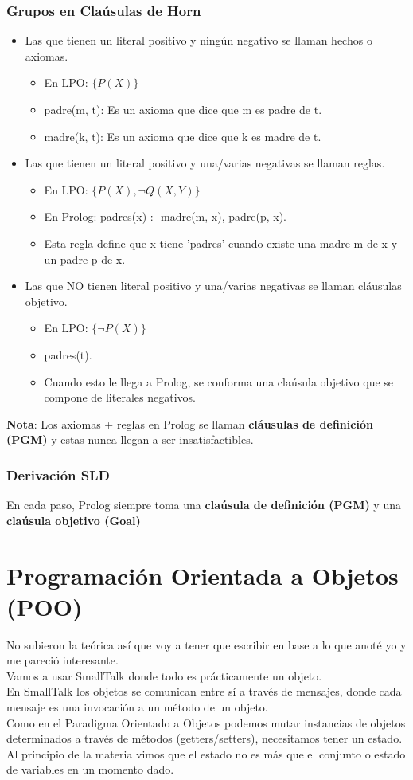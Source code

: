 \documentclass[10pt,a4paper]{article}
\begin{document}
\subsubsection*{Grupos en Claúsulas de Horn}
\begin{itemize}
    \item Las que tienen un literal positivo y ningún negativo se llaman hechos o axiomas.
    \begin{itemize}
        \item En LPO: $\{P(X)\}$
        \item padre(m, t): Es un axioma que dice que m es padre de t.
        \item madre(k, t): Es un axioma que dice que k es madre de t.
    \end{itemize}
    \item Las que tienen un literal positivo y una/varias negativas se llaman reglas.
    \begin{itemize}
        \item En LPO: $\{P(X), \neg Q(X,Y)\}$
        \item En Prolog: padres(x) :- madre(m, x), padre(p, x).
        \item Esta regla define que x tiene 'padres' cuando existe una madre m de x y un padre p de x.
    \end{itemize}
    \item Las que NO tienen literal positivo y una/varias negativas se llaman cláusulas objetivo.
    \begin{itemize}
        \item En LPO: $\{\neg P(X)\}$
        \item padres(t).
        \item Cuando esto le llega a Prolog, se conforma una claúsula objetivo que se compone de literales negativos.
    \end{itemize}
\end{itemize}
\textbf{Nota}: Los axiomas + reglas en Prolog se llaman \textbf{cláusulas de definición (PGM)} y estas nunca llegan a ser insatisfactibles. 
\subsubsection*{Derivación SLD}
En cada paso, Prolog siempre toma una \textbf{claúsula de definición (PGM)} y una \textbf{claúsula objetivo (Goal)}
\section*{Programación Orientada a Objetos (POO)}
No subieron la teórica así que voy a tener que escribir en base a lo que anoté yo y me pareció interesante. \\
Vamos a usar SmallTalk donde todo es prácticamente un objeto. \\
En SmallTalk los objetos se comunican entre sí a través de mensajes, donde cada mensaje es una invocación a un método de un objeto. \\
Como en el Paradigma Orientado a Objetos podemos mutar instancias de objetos determinados a través de métodos (getters/setters), necesitamos tener un estado. Al principio de la materia vimos que el estado no es más que el conjunto o estado de variables en un momento dado. 
\end{document}
